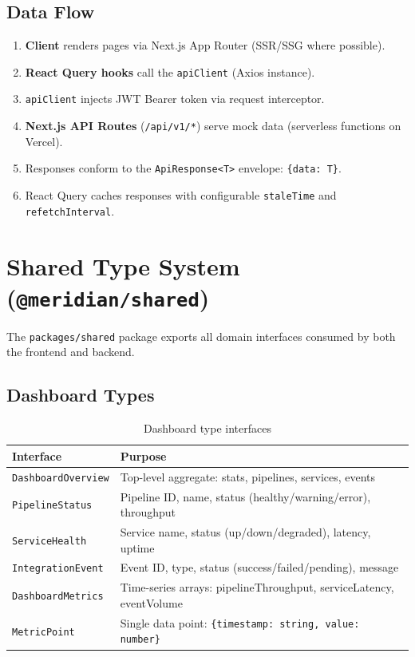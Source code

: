 \documentclass[12pt,a4paper]{article}
\begin{document}
\subsection{Data Flow}

\begin{enumerate}[leftmargin=2em]
  \item \textbf{Client} renders pages via Next.js App Router (SSR/SSG where possible).
  \item \textbf{React Query hooks} call the \texttt{apiClient} (Axios instance).
  \item \texttt{apiClient} injects JWT Bearer token via request interceptor.
  \item \textbf{Next.js API Routes} (\texttt{/api/v1/*}) serve mock data (serverless functions on Vercel).
  \item Responses conform to the \texttt{ApiResponse<T>} envelope: \texttt{\{data: T\}}.
  \item React Query caches responses with configurable \texttt{staleTime} and \texttt{refetchInterval}.
\end{enumerate}

\section{Shared Type System (\texttt{@meridian/shared})}

The \texttt{packages/shared} package exports all domain interfaces consumed by both the frontend and backend.

\subsection{Dashboard Types}

\begin{table}[H]
\centering
\begin{tabularx}{\textwidth}{lX}
\toprule
\textbf{Interface} & \textbf{Purpose} \\
\midrule
\texttt{DashboardOverview} & Top-level aggregate: stats, pipelines, services, events \\
\texttt{PipelineStatus}    & Pipeline ID, name, status (healthy/warning/error), throughput \\
\texttt{ServiceHealth}     & Service name, status (up/down/degraded), latency, uptime \\
\texttt{IntegrationEvent}  & Event ID, type, status (success/failed/pending), message \\
\texttt{DashboardMetrics}  & Time-series arrays: pipelineThroughput, serviceLatency, eventVolume \\
\texttt{MetricPoint}       & Single data point: \texttt{\{timestamp: string, value: number\}} \\
\bottomrule
\end{tabularx}
\caption{Dashboard type interfaces}
\end{table}
\end{document}
